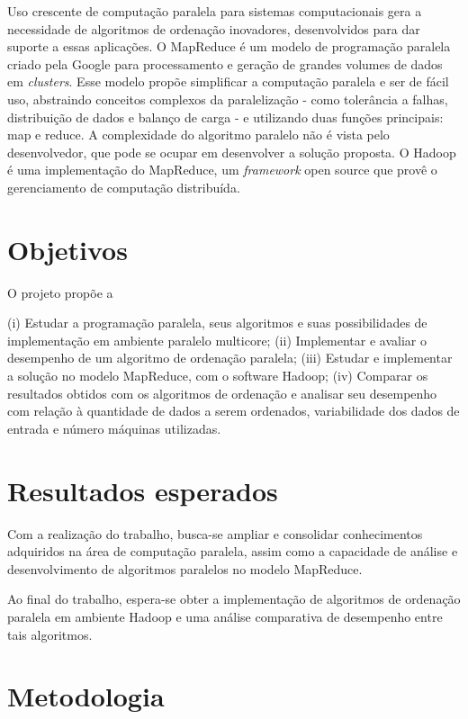 Uso crescente de computação paralela para sistemas computacionais gera a necessidade de algoritmos de ordenação inovadores, desenvolvidos para dar suporte a essas aplicações. 
O MapReduce\cite{Dean:2008}  é um modelo de programação paralela criado pela Google para processamento e geração de grandes volumes de dados em \textit{clusters}. Esse modelo propõe simplificar a computação paralela e ser de fácil uso, abstraindo conceitos complexos da paralelização - como tolerância a falhas, distribuição de dados e balanço de carga - e utilizando duas funções principais: map e reduce. A complexidade do algoritmo paralelo não é vista pelo desenvolvedor, que pode se ocupar em desenvolver a solução proposta. O Hadoop \cite{Hadoop:2010} é uma implementação do MapReduce, um \textit{framework} open source que provê o gerenciamento de computação distribuída. 


\section{Objetivos}

O projeto propõe a 

(i) Estudar a programação paralela, seus algoritmos e suas possibilidades de implementação em ambiente paralelo multicore;
(ii) Implementar e avaliar o desempenho de um algoritmo de ordenação paralela;
(iii) Estudar e implementar a solução no modelo MapReduce, com o software Hadoop;
(iv) Comparar os resultados obtidos com os algoritmos de ordenação e analisar seu desempenho com relação à quantidade de dados a serem ordenados, variabilidade dos dados de entrada e número máquinas utilizadas.

\section{Resultados esperados}

Com a realização do trabalho, busca-se ampliar e consolidar conhecimentos adquiridos na área de computação paralela, assim como
a capacidade de análise e desenvolvimento de algoritmos paralelos no modelo MapReduce. 


Ao final do trabalho, espera-se obter a implementação de algoritmos de ordenação paralela em ambiente Hadoop e uma análise comparativa de desempenho entre tais algoritmos.

\section{Metodologia}

